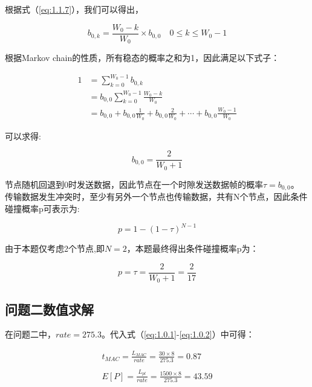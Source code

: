 \documentclass[bwprint]{gmcmthesis}
\begin{document}
根据式（\ref{eq:1.1.7}），我们可以得出，

\begin{equation}
    b_{0,k} = \frac{W_0-k}{W_0} \times b_{0,0}  \quad 0\le k \le W_0-1
    \label{eq:2.1.1}
\end{equation}

根据Markov chain的性质，所有稳态的概率之和为1，因此满足以下式子：


\begin{equation}
\begin{aligned}
    1 &= {\displaystyle \sum_{k=0}^{W_0-1}} b_{0,k} \\
&= b_{0,0} {\displaystyle \sum_{k=0}^{W_0-1}}\frac{W_0-k}{W_0} \\
&= b_{0,0}+ b_{0,0}\frac{1}{W_0} + b_{0,0}\frac{2}{W_0} +\cdots +b_{0,0}\frac{W_0-1}{W_0}
    \label{eq:2.1.2}
    \end{aligned}
\end{equation}


可以求得:

\begin{equation}
b_{0,0}=\frac{2}{W_0+1}
    \label{eq:2.1.3}
\end{equation}

节点随机回退到0时发送数据，因此节点在一个时隙发送数据帧的概率$\tau=b_{0,0}$。
传输数据发生冲突时，至少有另外一个节点也传输数据，共有N个节点，因此条件碰撞概率p可表示为:

\begin{equation}
p=1-(1-\tau )^{N-1}
    \label{eq:2.1.4}
\end{equation}

由于本题仅考虑2个节点,即$N=2$，本题最终得出条件碰撞概率p为：

\begin{equation}
p=\tau=\frac{2}{W_0+1}= \frac{2}{17}
    \label{eq:2.1.5}
\end{equation}

\subsection{问题二数值求解}

在问题二中，$rate = 275.3$。代入式（\ref{eq:1.0.1}-\ref{eq:1.0.2}）中可得：

\begin{equation}
\begin{matrix}
t_{MAC} =\displaystyle \frac{L_{MAC}}{rate} =\displaystyle \frac{30\times8}{275.3}=0.87 \\
\\
E[P] =\displaystyle \frac{L_{pl}}{rate} =\displaystyle \frac{1500\times8}{275.3}=43.59
\end{matrix}
\end{equation}
\end{document}
